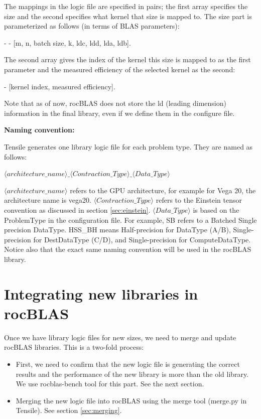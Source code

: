 \documentclass[]{article}
\begin{document}
The mappings in the logic file are specified in pairs; the first array specifies the size and the second specifies what kernel that size is mapped to. The size part is parameterized as follows (in terms of BLAS parameters):

\begin{center}
 	- - [m, n, batch size, k, ldc, ldd, lda, ldb].
\end{center}
\noindent
The second array gives the index of the kernel this size is mapped to as the first parameter and the measured efficiency of the selected kernel as the second:

\begin{center}
	- [kernel index, measured efficiency].
\end{center}

\noindent
Note that as of now, rocBLAS does not store the ld (leading dimension) information in the final library, even if we define them in the configure file.

\bigskip
\noindent

\textbf{\large{Naming convention:}}

\label{sec:naming}
\noindent
Tensile generates one library logic file for each problem type. They are named as follows:
\begin{center}
	$\langle architecture\_name \rangle \_\langle Contraction\_Type \rangle\_ \langle Data\_Type \rangle$
\end{center}

\noindent
$\langle architecture\_name \rangle$ refers to the GPU architecture, for example for Vega 20, the architecture name is vega20. $\langle Contraction\_Type \rangle$ refers to the Einstein tensor convention as discussed in section \ref{sec:einstein}. $\langle Data\_Type \rangle$ is based on the ProblemType in the configuration file. For example, SB refers to a Batched Single precision DataType. HSS\_BH means Half-precision for DataType (A/B), Single-precision for DestDataType (C/D), and Single-precision for ComputeDataType. Notice also that the exact same naming convention will be used in the rocBLAS library.

\section{Integrating new libraries in rocBLAS}
Once we have library logic files for new sizes, we need to merge and update rocBLAS libraries. This is a two-fold process:
\begin{itemize}
\item First, we need to confirm that the new logic file is generating the correct results and the performance of the new library is more than the old library. We use rocblas-bench tool for this part. See the next section.
\item Merging the new logic file into rocBLAS using the merge tool (merge.py in Tensile). See section \ref{sec:merging}.
\end{itemize}
\end{document}
